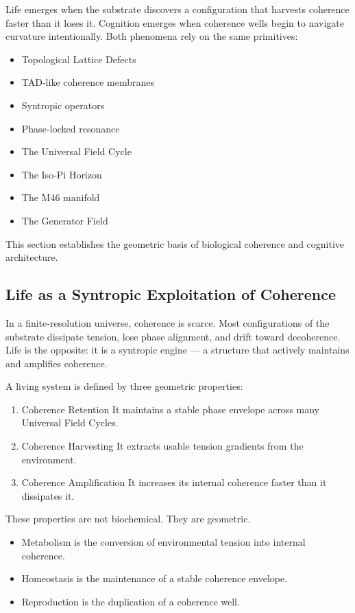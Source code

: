 \documentclass[reprint,amsmath,amssymb,aps,prl,floatfix]{revtex4-2}
\begin{document}
\begin{itemize}
Life emerges when the substrate discovers a configuration that harvests coherence faster than it loses it. Cognition emerges when coherence wells begin to navigate curvature intentionally. Both phenomena rely on the same primitives:
\begin{itemize}
\item Topological Lattice Defects  
\item TAD‑like coherence membranes  
\item Syntropic operators  
\item Phase‑locked resonance  
\item The Universal Field Cycle  
\item The Iso‑Pi Horizon  
\item The M46 manifold  
\item The Generator Field  
\end{itemize}
\medskip

This section establishes the geometric basis of biological coherence and cognitive architecture.

\subsection{Life as a Syntropic Exploitation of Coherence}

In a finite‑resolution universe, coherence is scarce.  
Most configurations of the substrate dissipate tension, lose phase alignment, and drift toward decoherence. Life is the opposite: it is a syntropic engine — a structure that actively maintains and amplifies coherence.

A living system is defined by three geometric properties:
\begin{enumerate}
\item Coherence Retention  
   It maintains a stable phase envelope across many Universal Field Cycles.

\item Coherence Harvesting  
   It extracts usable tension gradients from the environment.

\item Coherence Amplification  
   It increases its internal coherence faster than it dissipates it.
\end{enumerate}
\medskip

These properties are not biochemical.  
They are geometric.
\medskip
\begin{itemize}
\item Metabolism is the conversion of environmental tension into internal coherence.  
\item Homeostasis is the maintenance of a stable coherence envelope.  
\item Reproduction is the duplication of a coherence well.
\end{itemize}
\medskip


\end{itemize}
\end{document}
